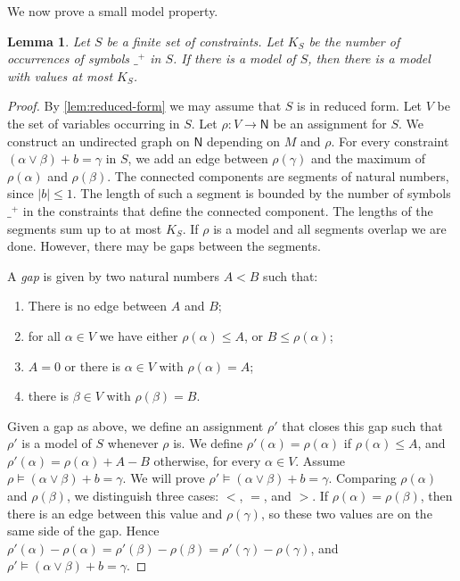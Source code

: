 \documentclass[11pt,a4paper]{article}
\newtheorem{lemma}{Lemma}[theorem]
\def\NN{\mathsf{N}}
\begin{document}
We now prove a small model property.
\begin{lemma}\label{lem:small-model}
Let  $S$ be a finite set of constraints.
Let $K_{S}$ be the number of occurrences of symbols $\_^+$ in $S$.
If there is a model of $S$, then there is a model with values at most $K_{S}$.
\end{lemma}

\begin{proof}
By \cref{lem:reduced-form} we may assume that $S$ is in reduced form.
Let $V$ be the set of variables occurring in $S$.
Let $\rho: V\to\NN$ be an assignment for $S$.
We construct an undirected graph on $\NN$ depending on $M$ and $\rho$.
For every constraint  $(\alpha\vee\beta)+b = \gamma$ in $S$,
we add an edge between $\rho(\gamma)$ and the maximum of $\rho(\alpha)$ and $\rho(\beta)$. 
The connected components are segments of natural numbers, since $|b|\leq 1$.
The length of such a segment is bounded by the number of symbols $\_^+$
in the constraints that define the connected component.
The lengths of the segments sum up to at most $K_{S}$.
If $\rho$ is a model and all segments overlap we are done.
However, there may be gaps between the segments.

A \emph{gap} is given by two natural numbers $A<B$ such that:
\begin{enumerate}
\item There is no edge between $A$ and $B$;
\item for all $\alpha\in V$ we have either $\rho(\alpha)\leq A$, or $B\leq\rho(\alpha)$; 
\item $A=0$ or there is $\alpha\in V$ with $\rho(\alpha)=A$;
\item there is $\beta\in V$ with $\rho(\beta)=B$.
\end{enumerate}

Given a gap as above, we define an assignment $\rho'$ that closes this gap
such that $\rho'$ is a model of $S$ whenever $\rho$ is. We define
$\rho'(\alpha) = \rho(\alpha)$ if $\rho(\alpha)\leq A$,
and $\rho'(\alpha) = \rho(\alpha)+A-B$ otherwise, for every $\alpha\in V$.
Assume $\rho\models (\alpha\vee\beta)+b = \gamma$.
We will prove $\rho'\models (\alpha\vee\beta)+b = \gamma$.
Comparing $\rho(\alpha)$ and $\rho(\beta)$, we distinguish three cases: $<$, $=$, and $>$.
If $\rho(\alpha) = \rho(\beta)$, then there is an edge between this value
and $\rho(\gamma)$, so these two values are on the same side of the gap.
Hence $\rho'(\alpha)-\rho(\alpha)=\rho'(\beta)-\rho(\beta)=\rho'(\gamma)-\rho(\gamma)$,
and $\rho'\models (\alpha\vee\beta)+b = \gamma$.


\end{proof}
\end{document}
